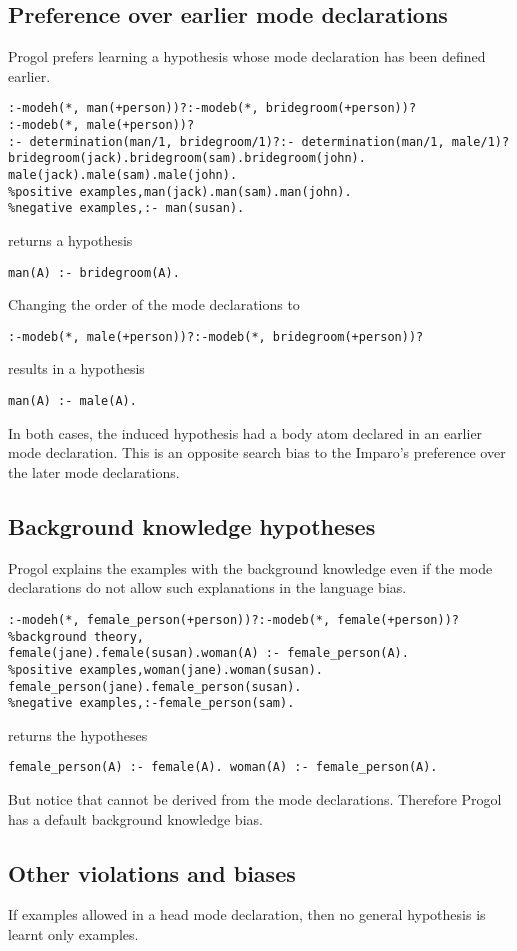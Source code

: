 \subsection{Preference over earlier mode declarations}
Progol prefers learning a hypothesis whose mode declaration has been defined earlier.

\begin{lstlisting}
:-modeh(*, man(+person))?:-modeb(*, bridegroom(+person))?
:-modeb(*, male(+person))?
:- determination(man/1, bridegroom/1)?:- determination(man/1, male/1)?
bridegroom(jack).bridegroom(sam).bridegroom(john).
male(jack).male(sam).male(john).
%positive examples,man(jack).man(sam).man(john).
%negative examples,:- man(susan).
\end{lstlisting}

returns a hypothesis
\begin{lstlisting}
man(A) :- bridegroom(A).
\end{lstlisting}

Changing the order of the mode declarations to
\begin{lstlisting}
:-modeb(*, male(+person))?:-modeb(*, bridegroom(+person))?
\end{lstlisting}
results in a hypothesis
\begin{lstlisting}
man(A) :- male(A).
\end{lstlisting}
In both cases, the induced hypothesis had a body atom declared in an earlier mode declaration. This is an opposite search bias to the Imparo's preference over the later mode declarations.

\subsection{Background knowledge hypotheses}
Progol explains the examples with the background knowledge even if the mode declarations do not allow such explanations in the language bias.

\begin{lstlisting}
:-modeh(*, female_person(+person))?:-modeb(*, female(+person))?
%background theory,
female(jane).female(susan).woman(A) :- female_person(A).
%positive examples,woman(jane).woman(susan).
female_person(jane).female_person(susan).
%negative examples,:-female_person(sam).
\end{lstlisting}
returns the hypotheses
\begin{lstlisting}
female_person(A) :- female(A). woman(A) :- female_person(A).
\end{lstlisting}
But notice that  cannot be derived from the mode declarations. Therefore Progol has a default background knowledge bias.

\subsection{Other violations and biases}
If examples allowed in a head mode declaration, then no general hypothesis is learnt only examples.
